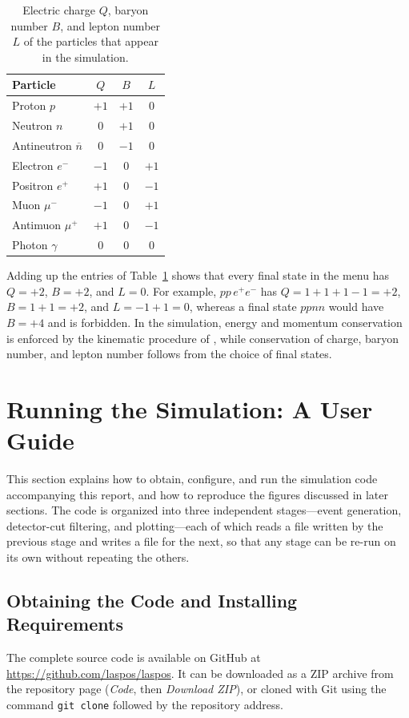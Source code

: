 \documentclass{article}
\begin{document}
\begin{table}[H]
\centering
\begin{tabular}{l c c c}
\hline
Particle & $Q$ & $B$ & $L$ \\
\hline
Proton $p$ & $+1$ & $+1$ & $0$ \\
Neutron $n$ & $0$ & $+1$ & $0$ \\
Antineutron $\overline{n}$ & $0$ & $-1$ & $0$ \\
Electron $e^-$ & $-1$ & $0$ & $+1$ \\
Positron $e^+$ & $+1$ & $0$ & $-1$ \\
Muon $\mu^-$ & $-1$ & $0$ & $+1$ \\
Antimuon $\mu^+$ & $+1$ & $0$ & $-1$ \\
Photon $\gamma$ & $0$ & $0$ & $0$ \\
\hline
\end{tabular}
\caption{Electric charge $Q$, baryon number $B$, and lepton number $L$ of the particles that appear in the simulation.}
\label{tab:quantum_numbers}
\end{table}

Adding up the entries of Table~\ref{tab:quantum_numbers} shows that every final state in the menu has $Q=+2$, $B=+2$, and $L=0$. For example, $pp\,e^+e^-$ has $Q=1+1+1-1=+2$, $B=1+1=+2$, and $L=-1+1=0$, whereas a final state $ppnn$ would have $B=+4$ and is forbidden. In the simulation, energy and momentum conservation is enforced by the kinematic procedure of , while conservation of charge, baryon number, and lepton number follows from the choice of final states.

\section{Running the Simulation: A User Guide}
\label{sec:user_guide}

This section explains how to obtain, configure, and run the simulation code accompanying this report, and how to reproduce the figures discussed in later sections. The code is organized into three independent stages---event generation, detector-cut filtering, and plotting---each of which reads a file written by the previous stage and writes a file for the next, so that any stage can be re-run on its own without repeating the others.

\subsection{Obtaining the Code and Installing Requirements}
\label{ssec:requirements}
The complete source code is available on GitHub at \url{https://github.com/laspos/laspos}. It can be downloaded as a ZIP archive from the repository page (\textit{Code}, then \textit{Download ZIP}), or cloned with Git using the command \texttt{git clone} followed by the repository address.
\end{document}
